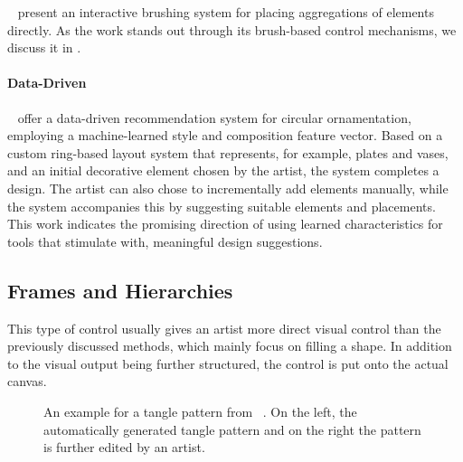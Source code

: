 \citeauthor*{hsu_2020_aef}~\cite{hsu_2020_aef} present an interactive brushing system for placing aggregations of elements directly. As the work stands out through its brush-based control mechanisms, we discuss it in .


\paragraph*{Data-Driven}
\label{para:analysis_element_arrangements_datadriven}

\citeauthor*{phan_2016_ple}~\cite{phan_2016_ple} offer a data-driven recommendation system for circular ornamentation, employing a machine-learned style and composition feature vector. Based on a custom ring-based layout system that represents, for example, plates and vases, and an initial decorative element chosen by the artist, the system completes a design. The artist can also chose to incrementally add elements manually, while the system accompanies this by suggesting suitable elements and placements. This work indicates the promising direction of using learned characteristics for tools that stimulate with, \eg meaningful design suggestions.


\subsection{Frames and Hierarchies}
\label{subsec:analysis_frames_and_hierarchies}

 This type of control usually gives an artist more direct visual control than the previously discussed methods, which mainly focus on filling a shape. In addition to the visual output being further structured, the control is put onto the actual canvas.

\begin{figure}
    \centering
    \caption{\label{fig:santoni_2016_ggp}An example for a tangle pattern from \citeauthor*{santoni_2016_ggp}~\cite{santoni_2016_ggp}. On the left, the automatically generated tangle pattern and on the right the pattern is further edited by an artist.}
\end{figure}

